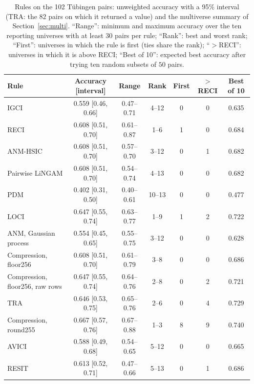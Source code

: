 \begin{table}[ht]
\caption{Rules on the 102 T\"ubingen pairs: unweighted accuracy with a 95\% interval (TRA: the $82$ pairs on which it returned a value) and the multiverse summary of Section~\ref{sec:multi}. ``Range'': minimum and maximum accuracy over the ten reporting universes with at least $30$ pairs per rule; ``Rank'': best and worst rank; ``First'': universes in which the rule is first (ties share the rank); ``$>$RECI'': universes in which it is above RECI; ``Best of 10'': expected best accuracy after trying ten random subsets of $50$ pairs.}
\label{tab:multi}
\small
\setlength{\tabcolsep}{3pt}
\begin{tabular}{@{}lcccccc@{}}
\toprule
Rule & Accuracy [interval] & Range & Rank & First & $>$RECI & Best of 10\\
\midrule
IGCI & 0.559 [0.46, 0.66] & 0.47--0.71 & 4--12 & 0 & 0 & 0.635\\
RECI & 0.608 [0.51, 0.70] & 0.61--0.87 & 1--6 & 1 & 0 & 0.684\\
ANM-HSIC & 0.608 [0.51, 0.70] & 0.57--0.70 & 3--12 & 0 & 1 & 0.682\\
Pairwise LiNGAM & 0.608 [0.51, 0.70] & 0.54--0.74 & 4--13 & 0 & 0 & 0.682\\
PDM & 0.402 [0.31, 0.50] & 0.40--0.61 & 10--13 & 0 & 0 & 0.477\\
LOCI & 0.647 [0.55, 0.74] & 0.63--0.77 & 1--9 & 1 & 2 & 0.722\\
ANM, Gaussian process & 0.554 [0.45, 0.65] & 0.55--0.75 & 3--12 & 0 & 0 & 0.628\\
Compression, floor256 & 0.608 [0.51, 0.70] & 0.61--0.79 & 3--8 & 0 & 0 & 0.686\\
Compression, floor256, raw rows & 0.647 [0.55, 0.74] & 0.64--0.76 & 2--8 & 0 & 2 & 0.721\\
TRA & 0.646 [0.53, 0.75] & 0.65--0.76 & 2--6 & 0 & 4 & 0.729\\
Compression, round255 & 0.667 [0.57, 0.76] & 0.67--0.88 & 1--3 & 8 & 9 & 0.740\\
AVICI & 0.588 [0.49, 0.68] & 0.54--0.65 & 5--12 & 0 & 0 & 0.665\\
RESIT & 0.613 [0.52, 0.71] & 0.47--0.66 & 5--13 & 0 & 1 & 0.686\\
\bottomrule
\end{tabular}
\end{table}

